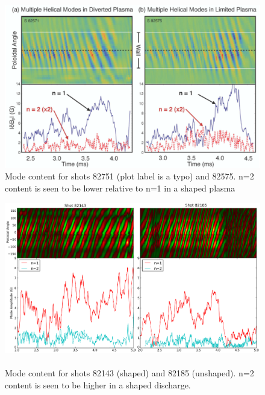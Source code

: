\documentclass[aps,prl,twocolumn,superscriptaddress,groupedaddress]{revtex4}  %
\begin{document}
\begin{figure}[htb]
	\centering
\includegraphics[scale=1]{../Plots/IAEA_plot_cropped.png}\caption{Mode content for shots 82751 (plot label is a typo) and 82575.  n=2 content is seen to be lower relative to n=1 in a shaped plasma}
	\label{IAEA_plot}
	\end{figure}
\begin{figure}[htb]
	\centering
\includegraphics[scale=.25]{../Plots/82143_82185mode_amp_stripes.png}\caption{\\Mode content for shots 82143 (shaped) and 82185 (unshaped).  n=2 content is seen to be higher in a shaped discharge.}
	\label{Modes_stripes_143_185}
	\end{figure}
\end{document}
